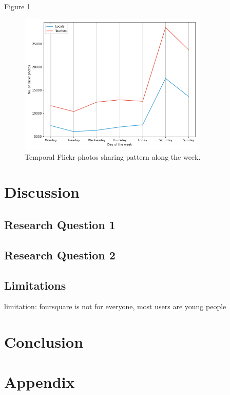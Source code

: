 \documentclass{article}
\begin{document}
Figure \ref{fig:flickr_trend_week}
\begin{figure}
\centering
\includegraphics[width=0.8\textwidth]{figures/flickr_trend_week.png}
\caption{\label{fig:flickr_trend_week}Temporal Flickr photos sharing pattern along the week.}
\end{figure}
\newpage


\section{Discussion}
\subsection{Research Question 1}

\subsection{Research Question 2}

\subsection{Limitations}
limitation: foursquare is not for everyone, most users are young people


\newpage


\section{Conclusion}
\newpage







\newpage
\section{Appendix}
\end{document}
